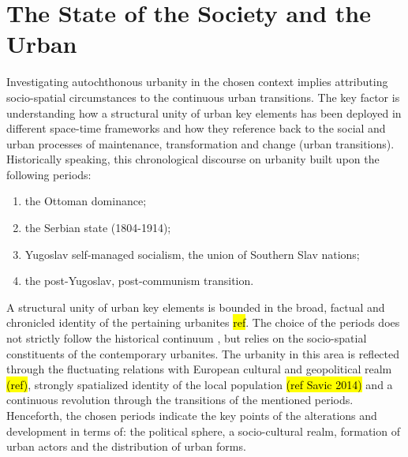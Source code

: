 \documentclass[11pt]{report}
\begin{document}
\section{The State of the Society and the Urban}


Investigating autochthonous urbanity in the chosen context implies attributing socio-spatial circumstances to the continuous urban transitions. The key factor is understanding how a structural unity of urban key elements has been deployed in different space-time frameworks and how they reference back to the social and urban processes of maintenance, transformation and change (urban transitions).
Historically speaking, this chronological discourse on urbanity built upon the following periods:
\begin{enumerate}
\item the Ottoman dominance;
\item the Serbian state (1804-1914); \footnotemark
\item Yugoslav self-managed socialism, the union of Southern Slav nations;
\item the post-Yugoslav, post-communism transition.
\end{enumerate}


A structural unity of urban key elements is bounded in the broad, factual and chronicled identity of the pertaining urbanites \hl{ref}. The choice of the periods does not strictly follow the historical continuum \footnotemark, but relies on the socio-spatial constituents of the contemporary urbanites. The urbanity in this area is reflected through the fluctuating relations with European cultural and geopolitical realm \hl{(ref)}, strongly spatialized identity of the local population \hl{(ref Savic 2014)} and a continuous revolution through the transitions of the mentioned periods. Henceforth, the chosen periods indicate the key points of the alterations and development in terms of: the political sphere, a socio-cultural realm, formation of urban actors and the distribution of urban forms.
\end{document}
